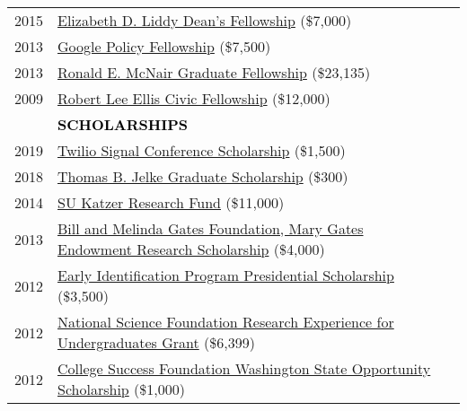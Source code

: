 \documentclass[11pt]{article}
\begin{document}
{{\begin{longtable}{Rp{0.75in}p{5.0in}}
\footnotesize{2015} & \href{https://news.syr.edu/2012/04/ischool-advisersu-trustee-creates-new-summer-ph-d-fellowships/}{Elizabeth D. Liddy Dean's Fellowship} (\$7,000)\\

\footnotesize{2013} & \href{https://www.google.com/policyfellowship/2013fellows.html}{Google Policy Fellowship} (\$7,500)\\

\footnotesize{2013} & \href{https://www.syracuse.edu/admissions/cost-and-aid/types-of-aid/graduate-student-aid/fellowships/}{Ronald E. McNair Graduate Fellowship} (\$23,135)\\

\footnotesize{2009} & \href{https://www.washington.edu/uaa/2010/04/22/uw-celebrates-undergraduate-leadership-and-civic-engagement/}{Robert Lee Ellis Civic Fellowship} (\$12,000)\\

& \textcolor{black}{\uppercase{\textbf{Scholarships}}}\\

\footnotesize{2019} & \href{https://signal.twilio.com/}{Twilio Signal Conference Scholarship} (\$1,500)\\

\footnotesize{2018} & \href{https://www.afa1976.org/foundation}{Thomas B. Jelke Graduate Scholarship} (\$300)\\

\footnotesize{2014} & \href{https://youtu.be/kFmO44rs3-c}{SU Katzer Research Fund} (\$11,000)\\

\footnotesize{2013} & \href{https://expo.uw.edu/public/offering/271}{Bill and Melinda Gates Foundation, Mary Gates Endowment Research Scholarship} (\$4,000)\\

\footnotesize{2012} & \href{https://expo.uw.edu/expo/apply/278/proceedings/offering_session/510}{Early Identification Program Presidential Scholarship} (\$3,500)\\

\footnotesize{2012} & \href{https://www.nsf.gov/crssprgm/reu/}{National Science Foundation Research Experience for Undergraduates Grant} (\$6,399)\\

\footnotesize{2012} & \href{https://www.waopportunityscholarship.org/}{College Success Foundation Washington State Opportunity Scholarship} (\$1,000)\\


\end{longtable}}}
\end{document}
